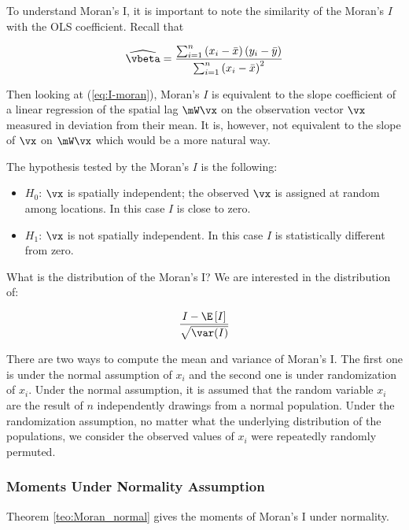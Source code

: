 To understand Moran's I, it is important to note the similarity of the Moran's $I$ with the OLS coefficient. Recall that 

\begin{equation}
  \widehat{\vbeta}= \frac{\sum_{i = 1}^n\left(x_i - \bar{x}\right)(y_i - \bar{y})}{\sum_{i = 1}^n \left(x_i - \bar{x}\right)^2}
\end{equation}

Then looking at (\ref{eq:I-moran}), Moran's $I$ is equivalent to the slope coefficient of a linear regression of the spatial lag $\mW\vx$ on the observation vector $\vx$ measured in deviation from their mean. It is, however, not equivalent to the slope of $\vx$ on $\mW\vx$ which would be a more natural way. 

The hypothesis tested by the Moran's $I$ is the following:

\begin{itemize}
  \item $H_0$: $\vx$ is spatially independent; the observed $\vx$ is assigned at random among locations. In this case $I$ is close to zero.
  \item $H_1$: $\vx$ is not spatially independent. In this case $I$ is statistically different from zero. 
\end{itemize}

What is the distribution of the Moran's I? We are interested in the distribution of:

\begin{equation*}
  \frac{I - \E\left[I\right]}{\sqrt{\var(I)}}
\end{equation*}

There are two ways to compute the mean and variance of Moran's I. The first one is under the normal assumption of $x_i$ and the second one is under randomization of $x_i$. Under the normal assumption, it is assumed that the random variable $x_i$ are the result of $n$ independently drawings from a normal population. Under the randomization assumption, no matter what the underlying distribution of the populations, we consider the observed values of $x_i$ were repeatedly randomly permuted.

\subsubsection{Moments Under Normality Assumption}

Theorem \ref{teo:Moran_normal} gives the moments of Moran's I under normality. 

